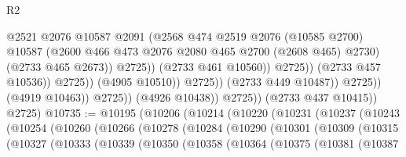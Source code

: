 \begin{lexlean}{R2}
\begin{coremodule}
                                                @2521
                                                @2076
                                                @10587
                                                @2091
                                                (@2568
                                                  @474
                                                  @2519
                                                  @2076
                                                  (@10585 @2700)
                                                  @10587
                                                  (@2600
                                                    @466
                                                    @473
                                                    @2076
                                                    @2080
                                                    @465
                                                    @2700
                                                    (@2608 @465)
                                                    @2730)
                                                  (@2733 @465 @2673))
                                                @2725))
                                            (@2733 @461 @10560))
                                          @2725))
                                      (@2733 @457 @10536))
                                    @2725))
                                (@4905 @10510))
                              @2725))
                          (@2733 @449 @10487))
                        @2725))
                    (@4919 @10463))
                  @2725))
              (@4926 @10438))
            @2725))
        (@2733 @437 @10415))
      @2725)
@10735 := @10195
    (@10206
      (@10214
        (@10220
          (@10231
            (@10237
              (@10243
                (@10254
                  (@10260
                    (@10266
                      (@10278
                        (@10284
                          (@10290
                            (@10301
                              (@10309
                                (@10315
                                  (@10327
                                    (@10333
                                      (@10339
                                        (@10350
                                          (@10358
                                            (@10364
                                              (@10375
                                                (@10381
                                                  (@10387

\end{coremodule}
\end{lexlean}
